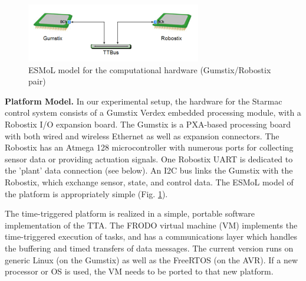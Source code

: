 \begin{figure}[ht]
\centering
\includegraphics[height=1in]{figures/platform.jpg}
    \caption{ESMoL model for the computational hardware (Gumstix/Robostix pair)}
    \label{fig:platform}
\end{figure}

\textbf{Platform Model.} In our experimental setup, the hardware for the Starmac control system consists of a Gumstix Verdex embedded processing module, with a Robostix I/O expansion board.  The Gumstix is a PXA-based processing board with both wired and wireless Ethernet as well as expansion connectors.  The Robostix has an Atmega 128 microcontroller with numerous ports for collecting sensor data or providing actuation signals.  One Robostix UART is dedicated to the 'plant' data connection (see below).  An I2C bus links the Gumstix with the Robostix, which exchange sensor, state, and control data.  The ESMoL model of the platform is appropriately simple (Fig. \ref{fig:platform}).

The time-triggered platform is realized in a simple, portable software implementation of the TTA\cite{RT_Thesis}.  The FRODO virtual machine (VM) implements the time-triggered execution of  tasks, and has a communications layer which handles the buffering and timed transfers of data messages.  The current version runs on generic Linux (on the Gumstix) as well as the FreeRTOS (on the AVR).  If a new processor or OS is used, the VM needs to be ported to that new platform. 


